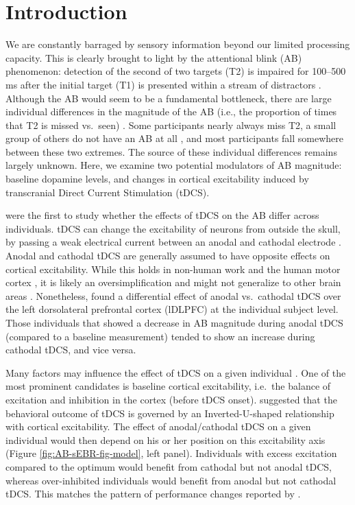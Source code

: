\documentclass[11pt,]{memoir}
\begin{document}
\hypertarget{AB_sEBR-introduction}{%
\section{Introduction}\label{AB_sEBR-introduction}}

We are constantly barraged by sensory information beyond our limited processing capacity. This is clearly brought to light by the attentional blink (AB) phenomenon: detection of the second of two targets (T2) is impaired for 100--500 ms after the initial target (T1) is presented within a stream of distractors \autocites{Raymond1992}[for reviews, see][]{Dux2009}{Martens2010}. Although the AB would seem to be a fundamental bottleneck, there are large individual differences in the magnitude of the AB (i.e., the proportion of times that T2 is missed vs.~seen) \autocite{Willems2016}. Some participants nearly always miss T2, a small group of others do not have an AB at all \autocite[e.g.][]{Martens2006}, and most participants fall somewhere between these two extremes. The source of these individual differences remains largely unknown. Here, we examine two potential modulators of AB magnitude: baseline dopamine levels, and changes in cortical excitability induced by transcranial Direct Current Stimulation (tDCS).

\textcite{London2015} were the first to study whether the effects of tDCS on the AB differ across individuals. tDCS can change the excitability of neurons from outside the skull, by passing a weak electrical current between an anodal and cathodal electrode \autocite{Gebodh2019a}. Anodal and cathodal tDCS are generally assumed to have opposite effects on cortical excitability. While this holds in non-human work \autocites{Purpura1965}{Bindman1964} and the human motor cortex \autocites{Nitsche2000}{Nitsche2001}, it is likely an oversimplification \autocite{Liu2018} and might not generalize to other brain areas \autocites{Bestmann2014}{Parkin2015}. Nonetheless, \textcite{London2015} found a differential effect of anodal vs.~cathodal tDCS over the left dorsolateral prefrontal cortex (lDLPFC) at the individual subject level. Those individuals that showed a decrease in AB magnitude during anodal tDCS (compared to a baseline measurement) tended to show an increase during cathodal tDCS, and vice versa.

Many factors may influence the effect of tDCS on a given individual \autocites{Krause2014}{Li2015b}. One of the most prominent candidates is baseline cortical excitability, i.e.~the balance of excitation and inhibition in the cortex (before tDCS onset). \textcite{Krause2013} suggested that the behavioral outcome of tDCS is governed by an Inverted-U-shaped relationship with cortical excitability. The effect of anodal/cathodal tDCS on a given individual would then depend on his or her position on this excitability axis (Figure \ref{fig:AB-sEBR-fig-model}, left panel). Individuals with excess excitation compared to the optimum would benefit from cathodal but not anodal tDCS, whereas over-inhibited individuals would benefit from anodal but not cathodal tDCS. This matches the pattern of performance changes reported by \textcite{London2015}.
\end{document}
